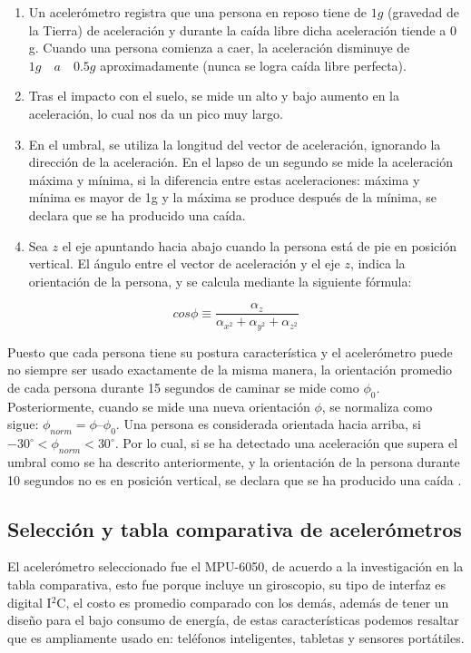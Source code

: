 \begin{enumerate}
	\item Un acelerómetro registra que una persona en reposo tiene de $1g$ (gravedad de la Tierra) de aceleración y durante la caída libre dicha aceleración tiende a 0 g. Cuando una persona comienza a caer, la aceleración disminuye de $1g \quad a \quad 0.5g$ aproximadamente (nunca se logra caída libre perfecta). 
	\item Tras el impacto con el suelo, se mide un alto y bajo aumento en la aceleración, lo cual nos da un pico muy largo.
	\item En el umbral, se utiliza la longitud del vector de aceleración, ignorando la dirección de la aceleración. En el lapso de un segundo se mide la aceleración máxima y mínima, si la diferencia entre estas aceleraciones: máxima y mínima es mayor de 1g y la máxima se produce después de la mínima, se declara que se ha producido una caída. 
	\item Sea $z$ el eje apuntando hacia abajo cuando la persona está de pie en posición vertical. El ángulo entre el vector de aceleración y el eje $z$, indica la orientación de la persona, y se calcula mediante la siguiente fórmula: 
\end{enumerate}

\begin{equation}
cos\phi \equiv \frac{{\alpha}_{z}}{{\alpha}_{x^2}+{\alpha}_{y^2}+{\alpha}_{z^2}}
\end{equation}

Puesto que cada persona tiene su postura característica y el acelerómetro puede no siempre ser usado exactamente de la misma manera, la orientación promedio de cada persona durante 15 segundos de caminar se mide como ${\phi}_{0}$. Posteriormente, cuando se mide una nueva orientación $\phi$, se normaliza como sigue: ${\phi}_{norm} = \phi – {\phi}_{0}$. Una persona es considerada orientada hacia arriba, si $-30^{\circ} < {\phi}_{norm} < 30^{\circ}$. Por lo cual, si se ha detectado una aceleración que supera el umbral como se ha descrito anteriormente, y la orientación de la persona durante 10 segundos no es en posición vertical, se declara que se ha producido una caída \cite{cincuenta}.

\subsection{Selección y tabla comparativa de acelerómetros}

El acelerómetro seleccionado fue el MPU-6050, de acuerdo a la investigación en la tabla comparativa, esto fue porque incluye un giroscopio, su tipo de interfaz es digital I$^{2}$C, el costo es promedio comparado con los demás, además de tener un diseño para el bajo consumo de energía, de estas características podemos resaltar que es ampliamente usado en: teléfonos inteligentes, tabletas y sensores portátiles. \\

